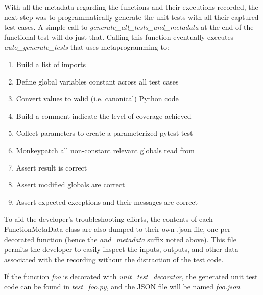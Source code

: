 With all the metadata regarding the functions and their executions recorded, 
the next step was to programmatically generate the unit tests with all their 
captured test cases. A simple call to \textit{generate\_all\_tests\_and\_metadata}
at the end of the functional test will do just that.
 Calling this function eventually executes 
\textit{auto\_generate\_tests} that uses metaprogramming to:
\begin{enumerate}
  \item Build a list of imports
  \item Define global variables constant across all test cases
  \item Convert values to valid (i.e. canonical) Python code
  \item Build a comment indicate the level of coverage achieved
  \item Collect parameters to create a parameterized pytest test
  \item Monkeypatch all non-constant relevant globals read from
  \item Assert result is correct
  \item Assert modified globals are correct
  \item Assert expected exceptions and their messages are correct
\end{enumerate}

To aid the developer's troubleshooting efforts, the contents of each FunctionMetaData
class are also dumped to their own .json file, one per decorated function (hence
the \textit{and\_metadata} suffix noted above).  This file permits the 
developer to easily inspect the inputs, outputs, and other data
associated with the recording without the distraction of the test code.

If the function \textit{foo} is decorated with \textit{unit\_test\_decorator},
the generated unit test code can be found in \textit{test\_foo.py}, and the 
JSON file will be named \textit{foo.json}


